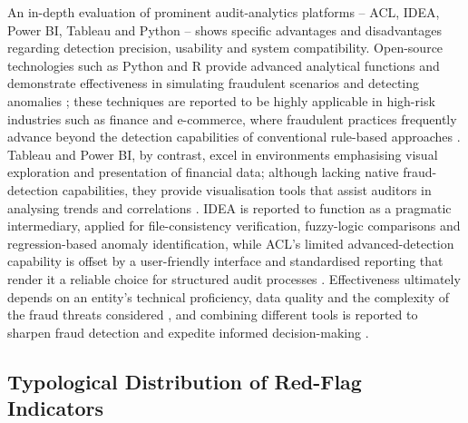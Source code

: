 \documentclass[preprint,12pt]{elsarticle}
\begin{document}
An in-depth evaluation of prominent audit-analytics platforms -- ACL, IDEA, Power BI, Tableau and Python -- shows specific advantages and disadvantages regarding detection precision, usability and system compatibility. Open-source technologies such as Python and R provide advanced analytical functions and demonstrate effectiveness in simulating fraudulent scenarios and detecting anomalies \citep{eldahshan2024}; these techniques are reported to be highly applicable in high-risk industries such as finance and e-commerce, where fraudulent practices frequently advance beyond the detection capabilities of conventional rule-based approaches \citep{balogun2021}. Tableau and Power BI, by contrast, excel in environments emphasising visual exploration and presentation of financial data; although lacking native fraud-detection capabilities, they provide visualisation tools that assist auditors in analysing trends and correlations \citep{thakkar2025}. IDEA is reported to function as a pragmatic intermediary, applied for file-consistency verification, fuzzy-logic comparisons and regression-based anomaly identification, while ACL's limited advanced-detection capability is offset by a user-friendly interface and standardised reporting that render it a reliable choice for structured audit processes \citep{pinto2024}. Effectiveness ultimately depends on an entity's technical proficiency, data quality and the complexity of the fraud threats considered \citep{sewpersadh2025}, and combining different tools is reported to sharpen fraud detection and expedite informed decision-making \citep{javaid2024}.

\subsection{Typological Distribution of Red-Flag Indicators}
\end{document}
